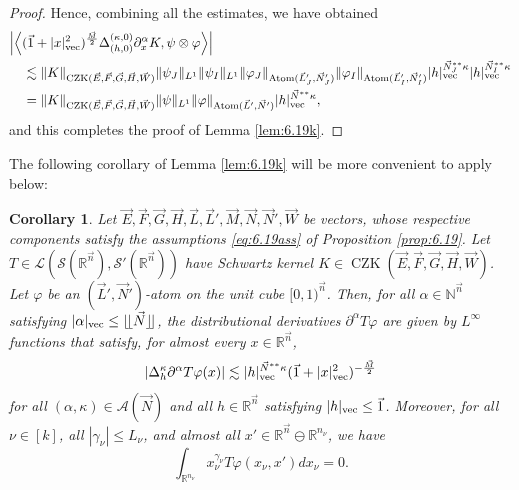 \documentclass[11pt, reqno]{amsart}
\newtheorem{corollary}[theorem]{Corollary}
\theoremstyle{definition}
\theoremstyle{remark}
\numberwithin{equation}{section}
\newcommand{\vE}{\vec E}
\newcommand{\vF}{\vec F}
\newcommand{\N}{\mathbb N}
\newcommand{\R}{\mathbb R}
\newcommand{\vone}{\vec 1}
\newcommand{\vn}{\vec n}
\newcommand{\Floor}[1]{\lfloor\!\lfloor #1 \rfloor\!\rfloor}
\newcommand{\Bpair}[2]{\Big\langle #1, #2 \Big\rangle}
\newcommand{\abs}[1]{|#1|}
\newcommand{\Babs}[1]{\Big|#1\Big|}
\newcommand{\Norm}[2]{\|#1\|_{#2}}
\begin{document}
\begin{proof}
Hence, combining all the estimates, we have obtained
\begin{equation*}
\begin{split}
  &\Babs{\Bpair{(\vec 1+\abs{x}_{\mathrm{vec}}^2)^{\frac{\vec M}{2}}\Delta_{(h,0)}^{(\kappa,0)}\partial_x^\alpha K}{\psi\otimes \varphi} } \\
  &\quad\lesssim\Norm{K}{\operatorname{CZK}(\vE,\vF,\vec G,\vec H,\vec W)}
  \Norm{\psi_J}{L^1}\Norm{\psi_I}{L^1}
  \Norm{\varphi_J}{ \operatorname{Atom}(\vec L_J',\vec N_J')}
  \Norm{\varphi_I}{\operatorname{Atom}(\vec L_I',\vec N_I')}
  \abs{h}_{\rm{vec}}^{\vec N_J^{**}\kappa}
  \abs{h}_{\rm{vec}}^{\vec N_I^{**}\kappa} \\
  &\quad=\Norm{K}{\operatorname{CZK}(\vE,\vF,\vec G,\vec H,\vec W)}
  \Norm{\psi}{L^1}
  \Norm{\varphi}{ \operatorname{Atom}(\vec L',\vec N')}
  \abs{h}_{\rm{vec}}^{\vec N^{**}\kappa},
\end{split}
\end{equation*}
and this completes the proof of Lemma \ref{lem:6.19k}.
\end{proof}

The following corollary of Lemma \ref{lem:6.19k} will be more convenient to apply below:

\begin{corollary}\label{cor:6.19k}
Let $\vE,\vF,\vec G,\vec H,\vec L,\vec L',\vec M,\vec N,\vec N',\vec W$ be vectors, whose respective components satisfy the assumptions \eqref{eq:6.19ass} of Proposition \ref{prop:6.19}.
Let $T\in\mathcal L(\mathscr S(\R^{\vn}),\mathscr S'(\R^{\vn}))$ have Schwartz kernel $K\in\operatorname{CZK}(\vE,\vF,\vec G,\vec H,\vec W)$.
Let $\varphi$ be an $(\vec L',\vec N')$-atom on the unit cube $[0,1)^{\vn}$.
Then, for all $\alpha\in\N^{\vn}$ satisfying
$\abs{\alpha}_{\rm{vec}}\leq\Floor{\vec N}$, the distributional derivatives
$\partial^\alpha T\varphi$ are given by $L^\infty$ functions that satisfy, for almost every $x\in\R^{\vn}$,
\begin{equation}\label{eq:Tphi<}
  \abs{\Delta_{h}^{\kappa}\partial^\alpha T\varphi (x)}
  \lesssim \abs{h}_{\rm{vec}}^{\vec N^{**}\kappa}(\vec 1+\abs{x}_{\mathrm{vec}}^2)^{-\frac{\vec M}{2}}
 \end{equation}
for all $(\alpha,\kappa)\in\mathscr A(\vec N)$ and all $h\in\R^{\vn}$
satisfying $\abs{h}_{\rm{vec}}\leq\vone$. Moreover, for all $\nu\in[k]$, all $\abs{\gamma_\nu}\leq L_\nu$, and almost all $x'\in\R^{\vn}\ominus\R^{n_\nu}$, we have
\begin{equation}\label{eq:intTphi=0}
   \int_{\R^{n_\nu}}x_{\nu}^{\gamma_\nu}T\varphi(x_\nu,x')dx_\nu = 0.
\end{equation}
\end{corollary}
\end{document}
